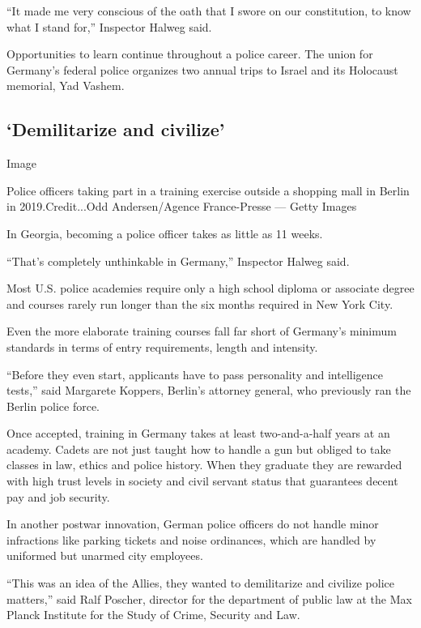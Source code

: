 ``It made me very conscious of the oath that I swore on our
constitution, to know what I stand for,'' Inspector Halweg said.

Opportunities to learn continue throughout a police career. The union
for Germany's federal police organizes two annual trips to Israel and
its Holocaust memorial, Yad Vashem.

\hypertarget{demilitarize-and-civilize}{%
\subsection{`Demilitarize and
civilize'}\label{demilitarize-and-civilize}}

Image

Police officers taking part in a training exercise outside a shopping
mall in Berlin in 2019.Credit...Odd Andersen/Agence France-Presse ---
Getty Images

In Georgia, becoming a police officer takes as little as 11 weeks.

``That's completely unthinkable in Germany,'' Inspector Halweg said.

Most U.S. police academies require only a high school diploma or
associate degree and courses rarely run longer than the six months
required in New York City.

Even the more elaborate training courses fall far short of Germany's
minimum standards in terms of entry requirements, length and intensity.

``Before they even start, applicants have to pass personality and
intelligence tests,'' said Margarete Koppers, Berlin's attorney general,
who previously ran the Berlin police force.

Once accepted, training in Germany takes at least two-and-a-half years
at an academy. Cadets are not just taught how to handle a gun but
obliged to take classes in law, ethics and police history. When they
graduate they are rewarded with high trust levels in society and civil
servant status that guarantees decent pay and job security.

In another postwar innovation, German police officers do not handle
minor infractions like parking tickets and noise ordinances, which are
handled by uniformed but unarmed city employees.

``This was an idea of the Allies, they wanted to demilitarize and
civilize police matters,'' said Ralf Poscher, director for the
department of public law at the Max Planck Institute for the Study of
Crime, Security and Law.

